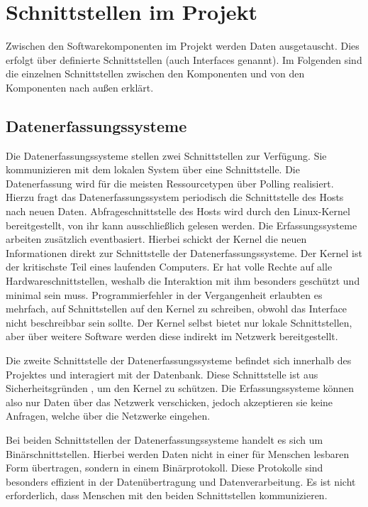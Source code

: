 \chapter{Schnittstellen im Projekt}
Zwischen den Softwarekomponenten im Projekt werden Daten ausgetauscht. Dies
erfolgt über definierte Schnittstellen (auch Interfaces genannt). Im Folgenden
sind die einzelnen Schnittstellen zwischen den Komponenten und von den
Komponenten nach außen erklärt.
\tm%

\section{Datenerfassungssysteme}
Die Datenerfassungssysteme stellen zwei Schnittstellen zur Verfügung. Sie
kommunizieren mit dem lokalen System über eine
 Schnittstelle. Die Datenerfassung wird
für die meisten Ressourcetypen über Polling realisiert. Hierzu fragt das
Datenerfassungssystem periodisch die Schnittstelle des Hosts nach neuen Daten.
Abfrageschnittstelle des Hosts wird durch den Linux\hyp{}Kernel bereitgestellt,
von ihr kann ausschließlich gelesen werden. Die Erfassungssysteme arbeiten
zusätzlich eventbasiert. Hierbei schickt der Kernel die neuen Informationen
direkt zur Schnittstelle der Datenerfassungssysteme. Der Kernel ist der
kritischste Teil eines laufenden Computers. Er hat volle Rechte auf alle
Hardwareschnittstellen, weshalb die Interaktion mit ihm besonders geschützt und
minimal sein muss. Programmierfehler in der Vergangenheit erlaubten es
mehrfach, auf Schnittstellen auf den Kernel zu schreiben, obwohl das Interface
nicht beschreibbar sein sollte. Der Kernel selbst bietet nur lokale
Schnittstellen, aber über weitere Software werden diese indirekt im Netzwerk
bereitgestellt.

Die zweite Schnittstelle der Datenerfassungssysteme befindet sich innerhalb des
Projektes und interagiert mit der Datenbank. Diese Schnittstelle ist aus
Sicherheitsgründen , um den Kernel zu
schützen. Die Erfassungssysteme können also nur Daten über das Netzwerk
verschicken, jedoch akzeptieren sie keine Anfragen, welche über die Netzwerke
eingehen.

Bei beiden Schnittstellen der Datenerfassungssysteme handelt es sich um
Binärschnittstellen. Hierbei werden Daten nicht in einer für Menschen lesbaren
Form übertragen, sondern in einem Binärprotokoll. Diese Protokolle sind
besonders effizient in der Datenübertragung und Datenverarbeitung. Es ist nicht
erforderlich, dass Menschen mit den beiden Schnittstellen kommunizieren.
\tm%

